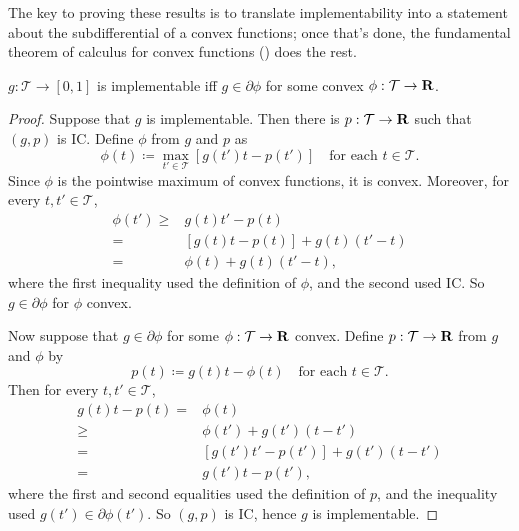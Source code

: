 \documentclass[11pt,letterpaper,reqno,oneside]{article}
\begin{document}
The key to proving these results is to translate implementability into a statement about the subdifferential of a convex functions; once that's done, the fundamental theorem of calculus for convex functions () does the rest.
%
\begin{lemma}
	\label{lemma:implementable_subdifferential_1d}
	$g : \mathcal{T} \to [0,1]$ is implementable iff $g \in \partial \phi$ for some convex $\phi : \mathcal{T} \to \mathbf{R}$.
\end{lemma}

\begin{proof}
	Suppose that $g$ is implementable. Then there is $p : \mathcal{T} \to \mathbf{R}$ such that $(g,p)$ is IC. Define $\phi$ from $g$ and $p$ as 
	\begin{equation*}
		\phi(t) \coloneqq \max_{t' \in \mathcal{T}} \left[ g(t') t - p(t') \right]
		\quad \text{for each $t \in \mathcal{T}$} .
	\end{equation*}
	Since $\phi$ is the pointwise maximum of convex functions, it is convex. Moreover, for every $t,t' \in \mathcal{T}$,
	\begin{align*}
		\phi(t')
		\geq{}& g(t) t' - p(t)
		\\
		={}& [ g(t) t - p(t) ] + g(t) (t'-t)
		\\
		={}& \phi(t) + g(t) (t'-t) ,
	\end{align*}
	where the first inequality used the definition of $\phi$, and the second used IC. So $g \in \partial \phi$ for $\phi$ convex.

	Now suppose that $g \in \partial \phi$ for some $\phi : \mathcal{T} \to \mathbf{R}$ convex. Define $p : \mathcal{T} \to \mathbf{R}$ from $g$ and $\phi$ by
	\begin{equation*}
		p(t) \coloneqq g(t) t - \phi(t)
		\quad\text{for each $t \in \mathcal{T}$} .
	\end{equation*}
	Then for every $t,t' \in \mathcal{T}$,
	\begin{align*}
		g(t) t - p(t) 
		={}& \phi(t)
		\\
		\geq{}& \phi(t') + g(t') (t-t')
		\\
		={}& [ g(t') t' - p(t') ] + g(t') (t-t')
		\\
		={}& g(t') t - p(t') ,
	\end{align*}
	where the first and second equalities used the definition of $p$, and the inequality used $g(t') \in \partial \phi(t')$. So $(g,p)$ is IC, hence $g$ is implementable.
\end{proof}
\end{document}

